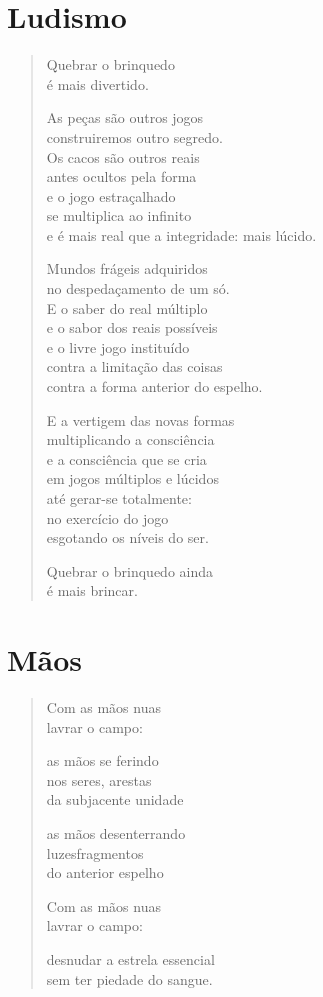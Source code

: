 \chapter{Ludismo}

\begin{verse}
Quebrar o brinquedo\\
é mais divertido.

As peças são outros jogos\\
construiremos outro segredo.\\
Os cacos são outros reais\\
antes ocultos pela forma\\
e o jogo estraçalhado\\
se multiplica ao infinito\\
e é mais real que a integridade: mais lúcido.

Mundos frágeis adquiridos\\
no despedaçamento de um só.\\
E o saber do real múltiplo\\
e o sabor dos reais possíveis\\
e o livre jogo instituído\\
contra a limitação das coisas\\
contra a forma anterior do espelho.

E a vertigem das novas formas\\
multiplicando a consciência\\
e a consciência que se cria\\
em jogos múltiplos e lúcidos\\
até gerar-se totalmente:\\
no exercício do jogo\\
esgotando os níveis do ser.

Quebrar o brinquedo ainda\\
é mais brincar.
\end{verse}

\chapter{Mãos}

\begin{verse}
Com as mãos nuas\\
lavrar o campo:

as mãos se ferindo\\
nos seres, arestas\\
da subjacente unidade

as mãos desenterrando\\
luzesfragmentos\\
do anterior espelho

Com as mãos nuas\\
lavrar o campo:

desnudar a estrela essencial\\
sem ter piedade do sangue.
\end{verse}

